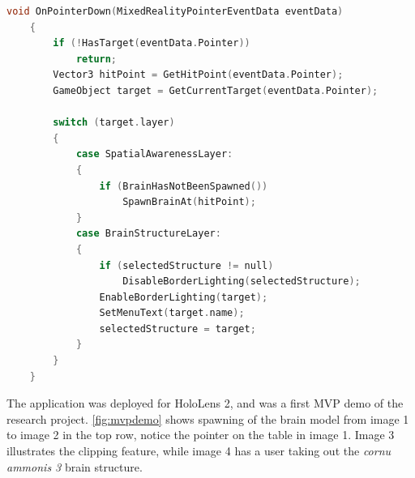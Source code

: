 \begin{lstlisting}[language=c, label={item:sudopointer}, caption={A simplified version of the event function called when a \texttt{Ponter} is clicked.}]
    void OnPointerDown(MixedRealityPointerEventData eventData)
    {
        if (!HasTarget(eventData.Pointer)) 
            return;
        Vector3 hitPoint = GetHitPoint(eventData.Pointer);
        GameObject target = GetCurrentTarget(eventData.Pointer);

        switch (target.layer)
        {
            case SpatialAwarenessLayer:
            {
                if (BrainHasNotBeenSpawned())
                    SpawnBrainAt(hitPoint);
            }
            case BrainStructureLayer:
            {
                if (selectedStructure != null)
                    DisableBorderLighting(selectedStructure);
                EnableBorderLighting(target);
                SetMenuText(target.name);
                selectedStructure = target;
            }
        }
    }
\end{lstlisting}

The application was deployed for HoloLens 2, and was a first MVP demo of the research project. \autoref{fig:mvpdemo} shows spawning of the brain model from image 1 to image 2 in the top row, notice the pointer on the table in image 1. Image 3 illustrates the clipping feature, while image 4 has a user taking out the \textit{cornu ammonis 3} brain structure.

